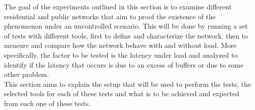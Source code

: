 \indent The goal of the experiments outlined in this section is to examine different 
residential and public networks that aim to proof the existence of the 
phenomenon under an uncontrolled scenario. This will be done by running a set of 
tests with different tools, first to define and characterize the network, then to 
measure and compare how the network behave with and without load. More specifically, 
the factor to be tested is the latency under load and analyzed to identify if the 
latency that occurs is due to an excess of buffers or due to some other problem.\\

This section aims to explain the setup that will be used to perform the tests,
the selected tools for each of these tests and what is to be achieved and 
expected from each one of these tests.\\
